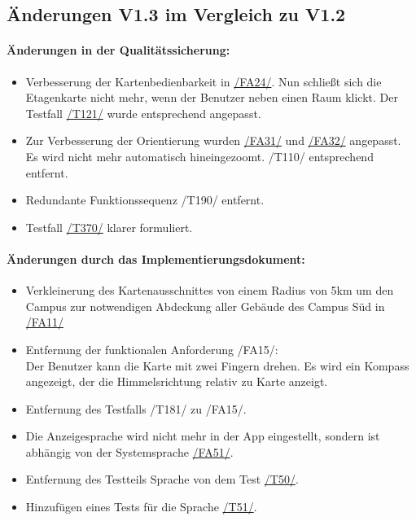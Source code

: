\subsection*{Änderungen V1.3 im Vergleich zu V1.2}
\paragraph*{Änderungen in der Qualitätssicherung:}
\begin{itemize}
    \item Verbesserung der Kartenbedienbarkeit in \hyperref[/FA24/]{/FA24/}. Nun schließt sich die Etagenkarte nicht mehr, wenn der Benutzer neben einen Raum klickt. Der Testfall \hyperref[/T121/]{/T121/} wurde entsprechend angepasst.
    \item Zur Verbesserung der Orientierung wurden \hyperref[/FA31/]{/FA31/} und \hyperref[/FA32/]{/FA32/} angepasst. Es wird nicht mehr automatisch hineingezoomt. /T110/ entsprechend entfernt.
    \item Redundante Funktionssequenz /T190/ entfernt.
    \item Testfall \hyperref[/T370/]{/T370/} klarer formuliert.
\end{itemize}

\paragraph*{Änderungen durch das Implementierungsdokument:}
\begin{itemize}
    \item Verkleinerung des Kartenausschnittes von einem Radius von 5km um den \Gls{Campus} zur notwendigen Abdeckung aller Gebäude des \Gls{Campus} Süd in \hyperref[/FA11/]{/FA11/}
    \item Entfernung der funktionalen Anforderung /FA15/: \\ Der \Gls{Benutzer} kann die \Gls{Karte} mit zwei Fingern drehen. Es wird ein Kompass angezeigt, der die Himmelsrichtung relativ zu \Gls{Karte} anzeigt.
    \item Entfernung des Testfalls /T181/ zu /FA15/.
    \item Die Anzeigesprache wird nicht mehr in der App eingestellt, sondern ist abhängig von der Systemsprache \hyperref[/FA51/]{/FA51/}.
    \item Entfernung des Testteils Sprache von dem Test \hyperref[/T50/]{/T50/}.
    \item Hinzufügen eines Tests für die Sprache \hyperref[/T51/]{/T51/}.
\end{itemize}